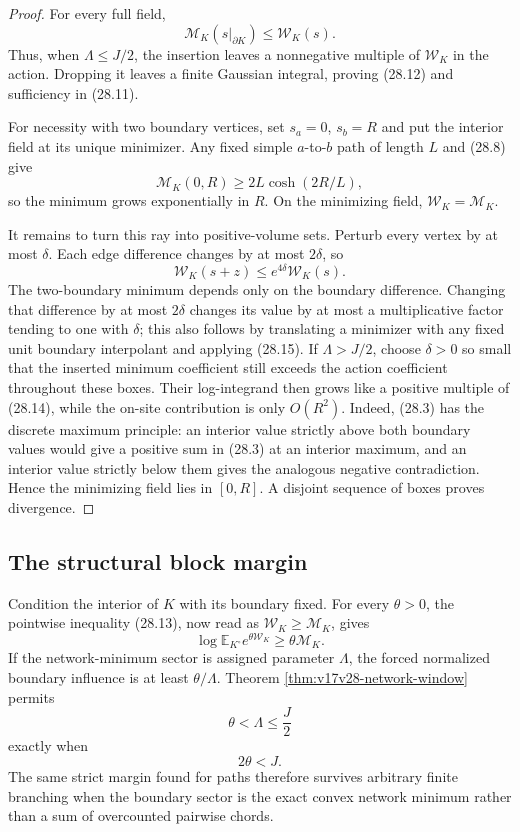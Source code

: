 \documentclass[11pt]{article}
\theoremstyle{remark}
\begin{document}
\begin{proof}
For every full field,
\[
 \mathcal M_K(s|_{\partial K})\leq\mathcal W_K(s). \tag{28.13}
\]
Thus, when \(\Lambda\leq J/2\), the insertion leaves a nonnegative
multiple of \(\mathcal W_K\) in the action.  Dropping it leaves a finite
Gaussian integral, proving (28.12) and sufficiency in (28.11).

For necessity with two boundary vertices, set \(s_a=0\), \(s_b=R\)
and put the interior field at its unique minimizer.  Any fixed simple
\(a\)-to-\(b\) path of length \(L\) and (28.8) give
\[
 \mathcal M_K(0,R)
 \geq2L\cosh(2R/L),                                \tag{28.14}
\]
so the minimum grows exponentially in \(R\).  On the minimizing field,
\(\mathcal W_K=\mathcal M_K\).

It remains to turn this ray into positive-volume sets.  Perturb every
vertex by at most \(\delta\).  Each edge difference changes by at most
\(2\delta\), so
\[
 \mathcal W_K(s+z)
 \leq e^{4\delta}\mathcal W_K(s).                 \tag{28.15}
\]
The two-boundary minimum depends only on the boundary difference.
Changing that difference by at most \(2\delta\) changes its value by at
most a multiplicative factor tending to one with \(\delta\); this also
follows by translating a minimizer with any fixed unit boundary
interpolant and applying (28.15).  If \(\Lambda>J/2\), choose
\(\delta>0\) so small that the inserted minimum coefficient still
exceeds the action coefficient throughout these boxes.  Their
log-integrand then grows like a positive multiple of (28.14), while the
on-site contribution is only \(O(R^2)\).  Indeed, (28.3) has the
discrete maximum principle: an interior value strictly above both
boundary values would give a positive sum in (28.3) at an interior
maximum, and an interior value strictly below them gives the analogous
negative contradiction.  Hence the minimizing field lies in
\([0,R]\).  A disjoint sequence of boxes proves divergence.
\end{proof}

\subsection{The structural block margin}

Condition the interior of \(K\) with its boundary fixed.  For every
\(\theta>0\), the pointwise inequality (28.13), now read as
\(\mathcal W_K\geq\mathcal M_K\), gives
\[
 \log\mathbb E_{K^\circ}
 e^{\theta\mathcal W_K}
 \geq\theta\mathcal M_K.                          \tag{28.16}
\]
If the network-minimum sector is assigned parameter \(\Lambda\), the
forced normalized boundary influence is at least
\(\theta/\Lambda\).  Theorem
\ref{thm:v17v28-network-window} permits
\[
 \theta<\Lambda\leq\frac J2                       \tag{28.17}
\]
exactly when
\[
 2\theta<J.                                        \tag{28.18}
\]
The same strict margin found for paths therefore survives arbitrary
finite branching when the boundary sector is the exact convex network
minimum rather than a sum of overcounted pairwise chords.
\end{document}
